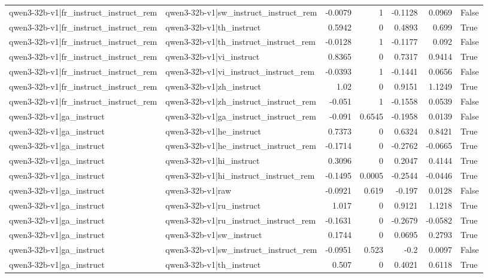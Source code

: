 \begin{table}
\begin{tabular}{l l r r r r l}
qwen3-32b-v1|fr_instruct_instruct_rem & qwen3-32b-v1|sw_instruct_instruct_rem & -0.0079 & 1 & -0.1128 & 0.0969 & False \\
qwen3-32b-v1|fr_instruct_instruct_rem & qwen3-32b-v1|th_instruct & 0.5942 & 0 & 0.4893 & 0.699 & True \\
qwen3-32b-v1|fr_instruct_instruct_rem & qwen3-32b-v1|th_instruct_instruct_rem & -0.0128 & 1 & -0.1177 & 0.092 & False \\
qwen3-32b-v1|fr_instruct_instruct_rem & qwen3-32b-v1|vi_instruct & 0.8365 & 0 & 0.7317 & 0.9414 & True \\
qwen3-32b-v1|fr_instruct_instruct_rem & qwen3-32b-v1|vi_instruct_instruct_rem & -0.0393 & 1 & -0.1441 & 0.0656 & False \\
qwen3-32b-v1|fr_instruct_instruct_rem & qwen3-32b-v1|zh_instruct & 1.02 & 0 & 0.9151 & 1.1249 & True \\
qwen3-32b-v1|fr_instruct_instruct_rem & qwen3-32b-v1|zh_instruct_instruct_rem & -0.051 & 1 & -0.1558 & 0.0539 & False \\
qwen3-32b-v1|ga_instruct & qwen3-32b-v1|ga_instruct_instruct_rem & -0.091 & 0.6545 & -0.1958 & 0.0139 & False \\
qwen3-32b-v1|ga_instruct & qwen3-32b-v1|he_instruct & 0.7373 & 0 & 0.6324 & 0.8421 & True \\
qwen3-32b-v1|ga_instruct & qwen3-32b-v1|he_instruct_instruct_rem & -0.1714 & 0 & -0.2762 & -0.0665 & True \\
qwen3-32b-v1|ga_instruct & qwen3-32b-v1|hi_instruct & 0.3096 & 0 & 0.2047 & 0.4144 & True \\
qwen3-32b-v1|ga_instruct & qwen3-32b-v1|hi_instruct_instruct_rem & -0.1495 & 0.0005 & -0.2544 & -0.0446 & True \\
qwen3-32b-v1|ga_instruct & qwen3-32b-v1|raw & -0.0921 & 0.619 & -0.197 & 0.0128 & False \\
qwen3-32b-v1|ga_instruct & qwen3-32b-v1|ru_instruct & 1.017 & 0 & 0.9121 & 1.1218 & True \\
qwen3-32b-v1|ga_instruct & qwen3-32b-v1|ru_instruct_instruct_rem & -0.1631 & 0 & -0.2679 & -0.0582 & True \\
qwen3-32b-v1|ga_instruct & qwen3-32b-v1|sw_instruct & 0.1744 & 0 & 0.0695 & 0.2793 & True \\
qwen3-32b-v1|ga_instruct & qwen3-32b-v1|sw_instruct_instruct_rem & -0.0951 & 0.523 & -0.2 & 0.0097 & False \\
qwen3-32b-v1|ga_instruct & qwen3-32b-v1|th_instruct & 0.507 & 0 & 0.4021 & 0.6118 & True \\

\end{tabular}
\end{table}
